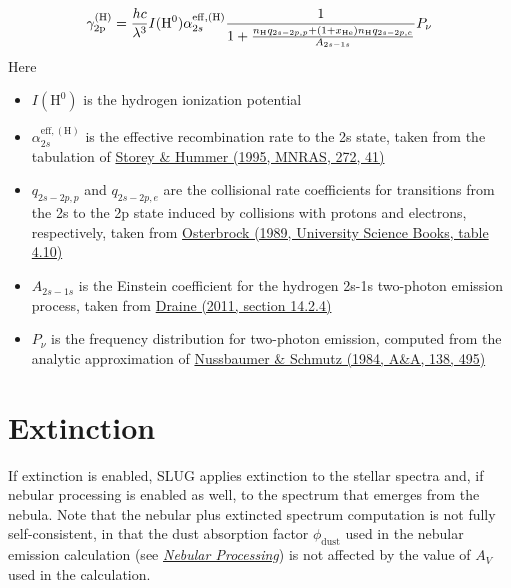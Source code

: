 \documentclass[letterpaper,10pt,english]{sphinxmanual}
\begin{document}
\begin{gather}
\begin{split}\gamma_{\mathrm{2p}}^{(\mathrm{H})} = \frac{hc}{\lambda^3} I(\mathrm{H}^0) \alpha_{2s}^{\mathrm{eff,(H)}} \frac{1}{1 + \frac{n_{\mathrm{H}} q_{2s-2p,p} + (1+x_{\mathrm{He}}) n_{\mathrm{H}} q_{2s-2p,e}}{A_{2s-1s}}} P_\nu\end{split}\notag
\end{gather}
Here
\begin{itemize}
\item {} 
\(I(\mathrm{H}^0)\) is the hydrogen ionization potential

\item {} 
\(\alpha_{2s}^{\mathrm{eff,(H)}}\) is the effective recombination rate to the 2s state, taken from the tabulation of \href{http://adsabs.harvard.edu/abs/1995MNRAS.272...41S}{Storey \& Hummer (1995, MNRAS, 272, 41)}

\item {} 
\(q_{2s-2p,p}\) and \(q_{2s-2p,e}\) are the collisional rate coefficients for transitions from the 2s to the 2p state induced by collisions with protons and electrons, respectively, taken from \href{http://adsabs.harvard.edu/abs/1989agna.book.....O}{Osterbrock (1989, University Science Books, table 4.10)}

\item {} 
\(A_{2s-1s}\) is the Einstein coefficient for the hydrogen 2s-1s two-photon emission process, taken from \href{http://adsabs.harvard.edu/abs/2011piim.book.....D}{Draine (2011, section 14.2.4)}

\item {} 
\(P_\nu\) is the frequency distribution for two-photon emission, computed from the analytic approximation of \href{http://adsabs.harvard.edu/abs/1984A\%26A...138..495N}{Nussbaumer \& Schmutz (1984, A\&A, 138, 495)}

\end{itemize}


\section{Extinction}
\label{intro:extinction}\label{intro:ssec-extinction}
If extinction is enabled, SLUG applies extinction to the stellar spectra and, if nebular processing is enabled as well, to the spectrum that emerges from the nebula. Note that the nebular plus extincted spectrum computation is not fully self-consistent, in that the dust absorption factor \(\phi_{\mathrm{dust}}\) used in the nebular emission calculation (see {\hyperref[intro:ssec-nebula]{\emph{Nebular Processing}}}) is not affected by the value of \(A_V\) used in the calculation.
\end{document}
